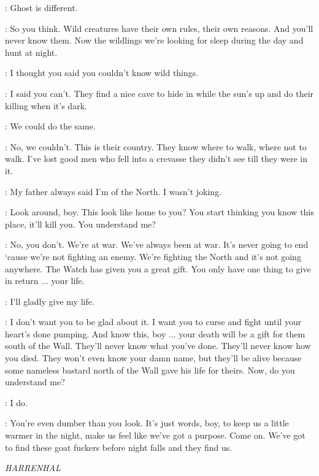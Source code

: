 \JON: Ghost is different. 

\HALFHAND: So you think. Wild creatures have their own rules, their own reasons. And you'll never know them. Now the wildlings we're looking for sleep during the day and hunt at night. 

\JON: I thought you said you couldn't know wild things. 

\HALFHAND: I said you can't. They find a nice cave to hide in while the sun's up and do their killing when it's dark. 

\JON: We could do the same. 

\HALFHAND: No, we couldn't. This is their country. They know where to walk, where not to walk. I've lost good men who fell into a crevasse they didn't see till they were in it. 

\JON: My father always said I'm of the North.  I wasn't joking. 

\HALFHAND: Look around, boy. This look like home to you? You start thinking you know this place, it'll kill you. You understand me? 


\HALFHAND: No, you don't. We're at war. We've always been at war. It's never going to end `cause we're not fighting an enemy. We're fighting the North and it's not going anywhere. The Watch has given you a great gift. You only have one thing to give in return $\ldots$ your life. 

\JON: I'll gladly give my life. 

\HALFHAND: I don't want you to be glad about it. I want you to curse and fight until your heart's done pumping. 
And know this, boy $\ldots$ your death will be a gift for them south of the Wall. They'll never know what you've done. They'll never know how you died. They won't even know your damn name, but they'll be alive because some nameless bastard north of the Wall gave his life for theirs. Now, do you understand me? 

\JON: I do. 

\HALFHAND: You're even dumber than you look. It's just words, boy, to keep us a little warmer in the night, make us feel like we've got a purpose. Come on. We've got to find these goat fuckers before night falls and they find us. 


\scene

\textit{HARRENHAL} 


